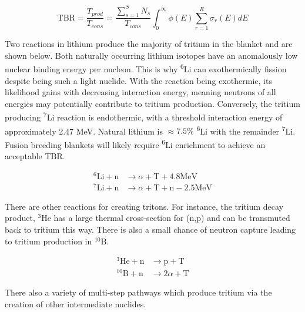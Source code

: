 \begin{equation}
  \label{eq:tbr}
  \mathrm{TBR} = \frac{T_{prod}}{T_{cons}} = \frac{\sum_{s=1}^{S} N_{s}}{T_{cons}} \int_{0}^{\infty} \phi(E) \sum_{r=1}^{R} \sigma_{r}(E) dE
\end{equation}

Two reactions in lithium produce the majority of tritium in the blanket and are shown below. Both naturally occurring lithium isotopes have an anomalously low nuclear binding energy per nucleon. This is why \textsuperscript{6}Li can exothermically fission despite being such a light nuclide. With the reaction being exothermic, its likelihood gains with decreasing interaction energy, meaning neutrons of all energies may potentially contribute to tritium production. Conversely, the tritium producing \textsuperscript{7}Li reaction is endothermic, with a threshold interaction energy of approximately 2.47 MeV. Natural lithium is $\approx 7.5\%$ \textsuperscript{6}Li with the remainder \textsuperscript{7}Li. Fusion breeding blankets will likely require \textsuperscript{6}Li enrichment to achieve an acceptable TBR.

\begin{equation}
\begin{split}
  ^{6}\mathrm{Li} + \mathrm{n} & \rightarrow \alpha + \mathrm{T} + 4.8\mathrm{MeV} \\
  ^{7}\mathrm{Li} + \mathrm{n} & \rightarrow \alpha + \mathrm{T} + \mathrm{n} - 2.5\mathrm{MeV}
\end{split}
\end{equation}

There are other reactions for creating tritons. For instance, the tritium decay product, $^{3}\mathrm{He}$ has a large thermal cross-section for (n,p) and can be transmuted back to tritium this way. There is also a small chance of neutron capture leading to tritium production in $^{10}\mathrm{B}$.

\begin{equation}
\begin{split}
  ^{3}\mathrm{He} + \mathrm{n} & \rightarrow \mathrm{p} + \mathrm{T} \\
  ^{10}\mathrm{B} + \mathrm{n} & \rightarrow 2\alpha + \mathrm{T}
\end{split}
\end{equation}

There also a variety of multi-step pathways which produce tritium via the creation of other intermediate nuclides. 


